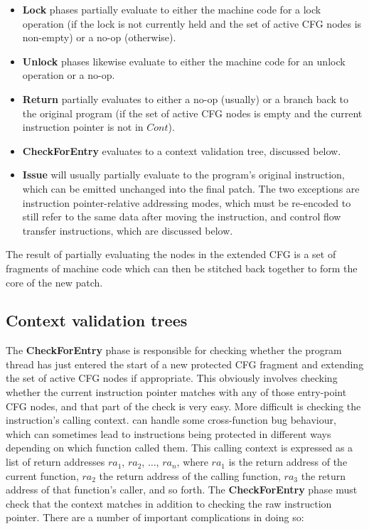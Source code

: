 \begin{itemize}
\item \textbf{Lock} phases partially evaluate to either the machine
  code for a lock operation (if the lock is not currently held and the
  set of active CFG nodes is non-empty) or a no-op (otherwise).

\item \textbf{Unlock} phases likewise evaluate to either the machine
  code for an unlock operation or a no-op.
\item \textbf{Return} partially evaluates to either a no-op (usually)
  or a branch back to the original program (if the set of active CFG
  nodes is empty and the current instruction pointer is not in
  $\mathit{Cont}$).

\item \textbf{CheckForEntry} evaluates to a context validation tree,
  discussed below.

\item \textbf{Issue} will usually partially evaluate to the program's
  original instruction, which can be emitted unchanged into the final
  patch.  The two exceptions are instruction pointer-relative
  addressing modes, which must be re-encoded to still refer to the
  same data after moving the instruction, and control flow transfer
  instructions, which are discussed below.
\end{itemize}

The result of partially evaluating the nodes in the extended CFG is a
set of fragments of machine code which can then be stitched back
together to form the core of the new patch.

\subsection{Context validation trees}

The \textbf{CheckForEntry} phase is responsible for checking whether
the program thread has just entered the start of a new protected CFG
fragment and extending the set of active CFG nodes if appropriate.
This obviously involves checking whether the current instruction
pointer matches with any of those entry-point CFG nodes, and that part
of the check is very easy.  More difficult is checking the
instruction's calling context.  {\Technique} can handle some
cross-function bug behaviour, which can sometimes lead to instructions
being protected in different ways depending on which function called
them.  This calling context is expressed as a list of return addresses
$ra_1$, $ra_2$, $\ldots$, $ra_n$, where $ra_1$ is the return address
of the current function, $ra_2$ the return address of the calling
function, $ra_3$ the return address of that function's caller, and so
forth.  The \textbf{CheckForEntry} phase must check that the context
matches in addition to checking the raw instruction pointer.  There
are a number of important complications in doing so:

